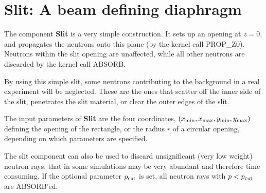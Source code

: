\section{Slit: A beam defining diaphragm}
\label{slit}


The component {\bf Slit} is a very simple construction.
It sets up an opening at $z=0$, and propagates the neutrons
onto this plane (by the kernel call PROP\_Z0).
Neutrons within the slit opening are unaffected,
while all other neutrons
are discarded by the kernel call ABSORB.

By using this simple slit, some neutrons contributing to the background
in a real experiment will be neglected.
These are the ones that scatter off the inner side
of the slit, penetrates the slit material,
or clear the outer edges of the slit.

The input parameters of {\bf Slit} are the four coordinates,
$(x_{\rm min}, x_{\rm max}, y_{\rm min}, y_{\rm max})$
defining the opening of the rectangle, or the radius $r$ of
a circular opening, depending on which parameters are specified.

The slit component can also be used to discard unsignificant (very low weight)
neutron rays, that in some simulations may be very abundant and therefore
time consuming. If the optional parameter $p_{\rm cut}$ is set, all
neutron rays with $p<p_{\rm cut}$ are ABSORB'ed.


